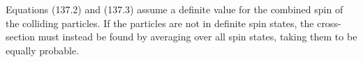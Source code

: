 Equations (137.2) and (137.3) assume a definite value for the combined spin of the colliding particles. If the particles are not in definite spin states, the cross-section must instead be found by averaging over all spin states, taking them to be equally probable.
